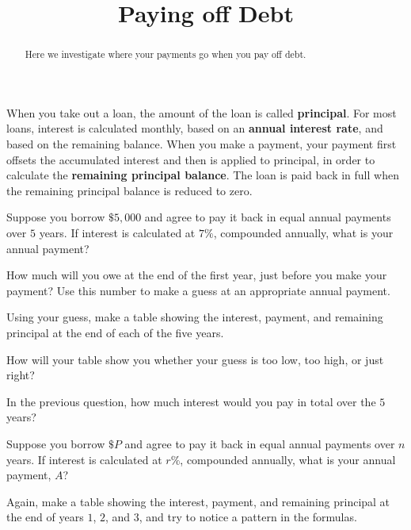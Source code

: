 \documentclass{ximera}
\title{Paying off Debt}
\begin{document}
\begin{abstract}
Here we investigate where your payments go when you pay off debt.
\end{abstract}
\maketitle

When you take out a loan, the amount of the loan is called
\textbf{principal}.  For most loans, interest is calculated monthly,
based on an \textbf{annual interest rate}, and based on the remaining
balance.  When you make a payment, your payment first offsets the
accumulated interest and then is applied to principal, in order to
calculate the \textbf{remaining principal balance}.  The loan is paid
back in full when the remaining principal balance is reduced to zero.
\begin{question}
Suppose you borrow $\$5,000$ and agree to pay it back in equal annual
payments over $5$ years.  If interest is calculated at $7\%$,
compounded annually, what is your annual payment?
\begin{hint}
How much will you owe at the end of the first year, just before you
make your payment?  Use this number to make a guess at an appropriate
annual payment.
\end{hint}
\begin{hint}
Using your guess, make a table showing the interest, payment, and
remaining principal at the end of each of the five years.
\end{hint}
\begin{hint}
How will your table show you whether your guess is too low, too high, or just right?  
\end{hint}
\begin{freeResponse}
\end{freeResponse}
\end{question}

\begin{question}
In the previous question, how much interest would you pay in total over the $5$ years? 
\begin{freeResponse}
\end{freeResponse}
\end{question}

\begin{question}
Suppose you borrow $\$P$ and agree to pay it back in equal annual
payments over $n$ years.  If interest is calculated at $r\%$,
compounded annually, what is your annual payment, $A$?
\begin{hint}
Again, make a table showing the interest, payment, and remaining
principal at the end of years $1$, $2$, and $3$, and try to notice a
pattern in the formulas.
\end{hint} 
\begin{freeResponse}
\end{freeResponse}
\end{question}
\end{document}

